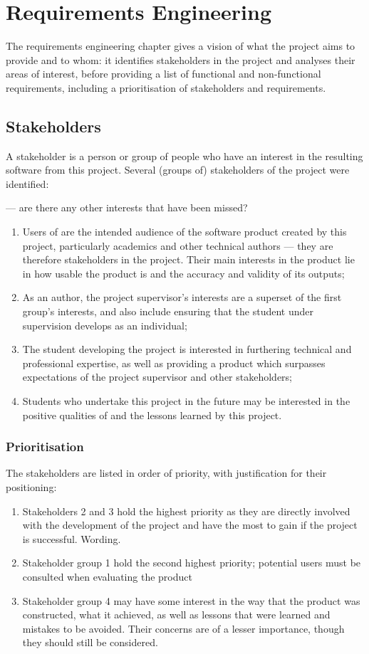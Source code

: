 \chapter{Requirements Engineering}
\label{reqs}
The requirements engineering chapter gives a vision of what the project aims to provide and to whom: it identifies stakeholders in the project and analyses their areas of interest, before providing a list of functional and non-functional requirements, including a prioritisation of stakeholders and requirements.

\section{Stakeholders}
A stakeholder is a person or group of people who have an interest in the resulting software from this project.  Several (groups of) stakeholders of the project were identified: 

\revisit --- are there any other interests that have been missed?

\begin{enumerate}
	\item Users of \bibtex{} are the intended audience of the software product created by this project, particularly academics and other technical authors --- they are therefore stakeholders in the project.  Their main interests in the product lie in how usable the product is and the accuracy and validity of its outputs;
	\item As an author, the project supervisor's interests are a superset of the first group's interests, and also include ensuring that the student under supervision develops as an individual;
	\item The student developing the project is interested in furthering technical and professional expertise, as well as providing a product which surpasses expectations of the project supervisor and other stakeholders;
	\item Students who undertake this project in the future may be interested in the positive qualities of and the lessons learned by this project.
\end{enumerate}

\subsection*{Prioritisation}
The stakeholders are listed in order of priority, with justification for their positioning:
\begin{enumerate}
	\item Stakeholders 2 and 3 hold the highest priority as they are directly involved with the development of the project and have the most to gain if the project is successful. \revisit Wording.
	\item Stakeholder group 1 hold the second highest priority; potential users must be consulted when evaluating the product
	\item Stakeholder group 4 may have some interest in the way that the product was constructed, what it achieved, as well as lessons that were learned and mistakes to be avoided.  Their concerns are of a lesser importance, though they should still be considered.
\end{enumerate}

